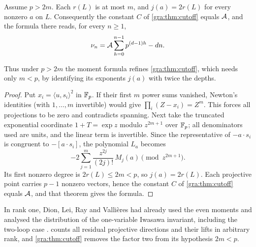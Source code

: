 \begin{theorem}\label{gra:thm:moments}
Assume $p>2m$. Each $r(L)$ is at most $m$, and $j(a)=2r(L)$ for every
nonzero $a$ on $L$. Consequently the constant $C$ of \cref{gra:thm:cutoff}
equals $\mathcal{A}$, and the formula there reads, for every $n\ge1$,
\[
 \nu_n=\mathcal{A}\sum_{h=0}^{n-1}p^{(d-1)h}-dn .
\]
\end{theorem}

Thus under $p>2m$ the moment formula refines \cref{gra:thm:cutoff}, which
needs only $m<p$, by identifying its exponents $j(a)$ with twice the depths.

\begin{proof}
Put $x_i=\langle u,s_i\rangle^2$ in $\mathbb{F}_p$. If their first $m$ power sums
vanished, Newton's identities (with $1,\dots,m$ invertible) would give
$\prod_i(Z-x_i)=Z^m$. This forces all projections to be zero and
contradicts spanning. Next take the truncated exponential coordinate
$1+T=\exp z$ modulo $z^{2m+1}$ over $\mathbb{F}_p$; all denominators used are
units, and the linear term is invertible. Since the representative of
$-a\cdot s_i$ is congruent to $-[a\cdot s_i]$, the polynomial $L_a$ becomes
\[
 -2\sum_{j=1}^m\frac{z^{2j}}{(2j)!}\,M_j(a)\pmod{z^{2m+1}} .
\]
Its first nonzero degree is $2r(L)\le2m<p$, so $j(a)=2r(L)$. Each
projective point carries $p-1$ nonzero vectors, hence the constant $C$ of
\cref{gra:thm:cutoff} equals $\mathcal{A}$, and that theorem gives the formula.
\end{proof}


In rank one, Dion, Lei, Ray and Valli\`eres had already used the even
moments and analysed the distribution of the one-variable Iwasawa
invariant, including the two-loop case
\cite[Theorem~4.13 and Proposition~4.19]{DionLeiRayVallieres2024Distribution}.
 counts all residual projective directions and their
lifts in arbitrary rank, and \cref{gra:thm:cutoff} removes the factor two
from its hypothesis $2m<p$.


